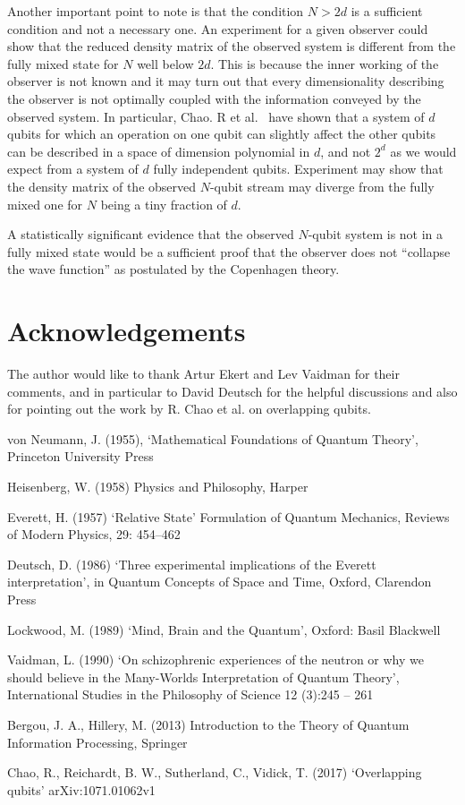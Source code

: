 \documentclass[11pt,amsmath,amssymb,latexsym,a4paper]{article}
\newcommand{\highlight}[1] {#1}
\begin{document}
Another important point to note is that the condition $N > 2d$ is a sufficient condition and not a necessary one. An experiment for a given observer could show that the reduced density matrix of the observed system is different from the fully mixed state for $N$ well below $2d$. This is because the inner working of the observer is not known and it may turn out that every dimensionality describing the observer is not optimally coupled with the information conveyed by the observed system.  \highlight{In particular, Chao. R et al.~\cite{Chao} have shown that a system of $d$ qubits for which an operation on one qubit can slightly affect the other qubits can be described in a space of dimension polynomial in $d$, and not $2^d$ as we would expect from a system of $d$ fully independent qubits.} Experiment may show that the density matrix of the observed $N$-qubit stream may diverge from the fully mixed one for $N$ being a tiny fraction of $d$. 

A statistically significant evidence that the observed $N$-qubit system is not in a fully mixed state would be a sufficient proof that the observer does not ``collapse the wave function'' as postulated by the Copenhagen theory.

\highlight{
\section{Acknowledgements}
The author would like to thank Artur Ekert and Lev Vaidman for their comments, and in particular to David Deutsch for the helpful discussions and also for pointing out the work by R. Chao et al. on overlapping qubits.
}

\begin{thebibliography}{}
 von Neumann, J. (1955), `Mathematical Foundations of Quantum Theory', Princeton University Press

 Heisenberg, W. (1958) Physics and Philosophy, Harper

 Everett, H. (1957) ‘Relative State’ Formulation of Quantum Mechanics, Reviews of Modern Physics, 29: 454–462

 Deutsch, D. (1986) `Three experimental implications of the Everett interpretation', in Quantum Concepts of Space and Time, Oxford, Clarendon Press

 Lockwood, M. (1989) `Mind, Brain and the Quantum', Oxford: Basil Blackwell

 Vaidman, L. (1990) `On schizophrenic experiences of the neutron or why we should believe in the Many-Worlds Interpretation of Quantum Theory', International Studies in the Philosophy of Science 12 (3):245 – 261

 Bergou, J. A., Hillery, M. (2013) Introduction to the Theory of Quantum Information Processing, Springer

 Chao, R., Reichardt, B. W., Sutherland, C., Vidick, T. (2017) `Overlapping qubits' arXiv:1071.01062v1

\end{thebibliography}
\end{document}

